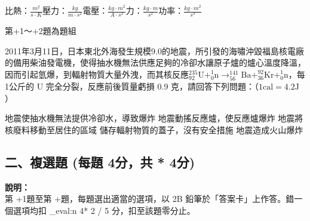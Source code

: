 \documentclass[10pt,a4paper]{article}
\newcommand{\mcscore}{4}
\begin{document}
{比熱：$\frac{m^2}{s\cdot K}$}{壓力：$\frac{kg}{m\cdot s^2}$}{電壓：$\frac{kg\cdot m^2}{A\cdot s^2}$}{力：$\frac{kg\cdot m}{s^2}$}{功率：$\frac{kg\cdot m^2}{s^3}$}


\newpage
\noindent 第\the\numexpr\value{qcount}+1\relax ～\the\numexpr\value{qcount}+2\relax 題為題組

2011年3月11日，日本東北外海發生規模9.0的地震，所引發的海嘯沖毀福島核電廠的備用柴油發電機，使得抽水機無法供應足夠的冷卻水讓原子爐的爐心溫度降溫，因而引起氫爆，到輻射物質大量外洩，而其核反應$^{235}_{92}\text{U}+^{1}_{0}\text{n}\rightarrow ^{141}_{56}\text{Ba}+^{92}_{36}\text{Kr}+^{1}_{0}\text{n}$，每1公斤的 U 完全分裂，反應前後質量虧損 0.9 克，請回答下列問題：（$1\text{cal}=4.2\text{J}$）


{地震使抽水機無法提供冷卻水，導致爆炸}
{地震動搖反應爐，使反應爐爆炸}
{地震將核廢料移動至居住的區域}
{儲存輻射物質的蓋子，沒有安全措施}
{地震造成火山爆炸}

\subsection*{二、複選題 (每題 \mcscore 分，共 \the\numexpr {} * \mcscore \relax 分)}
\begin{center}
    \begin{tcolorbox}[colframe=black, colback=white, halign=left, width=\textwidth, arc=2mm]
        \small \textbf{說明：} \\
        第 \the\numexpr\value{qcount}+1\relax 題至第 \the\numexpr\value{qcount}+\relax 題，每題選出適當的選項，以 2B 鉛筆於「答案卡」上作答。錯一個選項均扣
        \ExplSyntaxOn
            \fp_eval:n { \mcscore * 2 / 5 }
        \ExplSyntaxOff 分，扣至該題零分止。 \\
    \end{tcolorbox}
\end{center}
\end{document}
